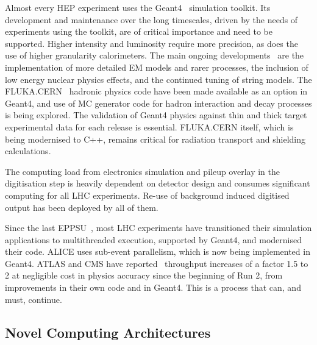 \documentclass[10pt,a4paper]{article}
\begin{document}
Almost every HEP experiment uses the Geant4~\cite{ALLISON2016187, 1610988, GEANT4:2002zbu}
simulation toolkit. Its
development and maintenance over the long timescales, driven by the needs of
experiments using the toolkit, are of critical importance and need to be
supported. Higher intensity and luminosity require more precision, as does the
use of higher granularity calorimeters. The main ongoing
developments~\cite{g4inputs} are the implementation of more detailed EM models
and rarer processes, the inclusion of low energy nuclear physics effects, and
the continued tuning of string models. The
FLUKA.CERN~\cite{FLUKA:new_capabiliies, battistoni_2024_stv3r-7ar12} hadronic
physics code have been made available as an option in Geant4, and use of MC
generator code for hadron interaction and decay processes is being explored.
The validation of Geant4 physics against thin and thick target experimental data
for each release is essential. FLUKA.CERN itself, which is being modernised to
C++, remains critical for radiation transport and shielding calculations.

The computing load from electronics simulation and pileup overlay in the
digitisation step is heavily dependent on detector design and consumes
significant computing for all LHC experiments. Re-use of background
induced digitised output has been deployed by all of them.

Since the last EPPSU~\cite{European:2720131}, most LHC experiments have transitioned
their simulation applications to multithreaded execution, supported by Geant4,
and modernised their code. ALICE uses sub-event parallelism, which is now being
implemented in Geant4. ATLAS and CMS have
reported~\cite{ATLAS:2024_swcomp_run3, CMS:computing_results_2023} throughput
increases of a factor 1.5 to 2 at negligible cost in physics accuracy since the
beginning of Run 2, from improvements in their own code and in Geant4. This is a
process that can, and must, continue.

\subsection{Novel Computing
Architectures}\label{novel-computing-architectures}
\end{document}
